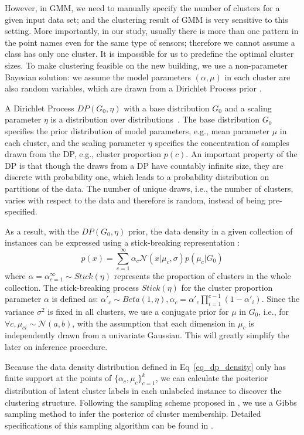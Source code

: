 However, in GMM, we need to manually specify the number of clusters for a given input data set; and the clustering result of GMM is very sensitive to this setting. More importantly, 
in our study, usually there is more than one pattern in the point names even for the same type of sensors; therefore we cannot assume a class has only one cluster. It is impossible for us to predefine the 
optimal cluster sizes. To make clustering feasible on the new building, we use a non-parameter Bayesian solution: we assume the model parameters $(\alpha, \mu)$ in each cluster are also random variables, which are drawn from a Dirichlet Process prior \cite{dp}.

A Dirichlet Process $DP(G_0, \eta)$ with a base distribution $G_0$ and a scaling parameter $\eta$ is a distribution over distributions~\cite{dp}. The base distribution $G_0$ specifies the prior distribution of model parameters, e.g., mean parameter $\mu$ in each cluster, and the scaling parameter $\eta$ specifies the concentration of samples drawn from the DP, e.g., cluster proportion $p(c)$. An important property of the DP is that though the draws from a DP have countably infinite size, they are discrete with probability one, which leads to a probability distribution on partitions of the data. The number of unique draws, i.e., the number of clusters, varies with respect to the data and therefore is random, instead of being pre-specified.

As a result, with the $DP(G_{0}, \eta)$ prior, the data density in a given collection of instances can be expressed using a stick-breaking representation
\cite{sethuraman1994constructive}:
\begin{equation}\label{eq_dp_density}
p(x)=\sum_{c=1}^\infty \alpha_c \mathcal{N}(x|\mu_c,\sigma)p(\mu_c|G_0)
\end{equation}
where $\alpha={\alpha}_{c=1}^\infty\sim Stick(\eta)$ represents the proportion of clusters in the whole collection. The stick-breaking process $Stick(\eta)$ for the cluster proportion parameter $\alpha$ is defined as: $\alpha'_c\sim Beta(1, \eta), \alpha_c=\alpha'_c\prod_{i=1}^{c-1}(1-\alpha'_i)$. Since the variance $\sigma^2$ is fixed in all clusters, we use a conjugate prior for $\mu$ in $G_0$, i.e., for $\forall c, \mu_{ci}\sim \mathcal{N}(a,b)$, with the assumption that each dimension in $\mu_c$ is independently drawn from a univariate Gaussian. This will greatly simplify the later on inference procedure.

Because the data density distribution defined in Eq~\eqref{eq_dp_density} only has finite support at the points of $\{\alpha_c, \mu_c\}^k_{c=1}$, we can calculate the posterior distribution of latent cluster labels in each unlabeled instance to discover the clustering structure. Following the sampling scheme proposed in \cite{neal2000markov}, we use a Gibbs sampling method to infer the posterior of cluster membership. Detailed specifications of this sampling algorithm can be found in \cite{neal2000markov}.


